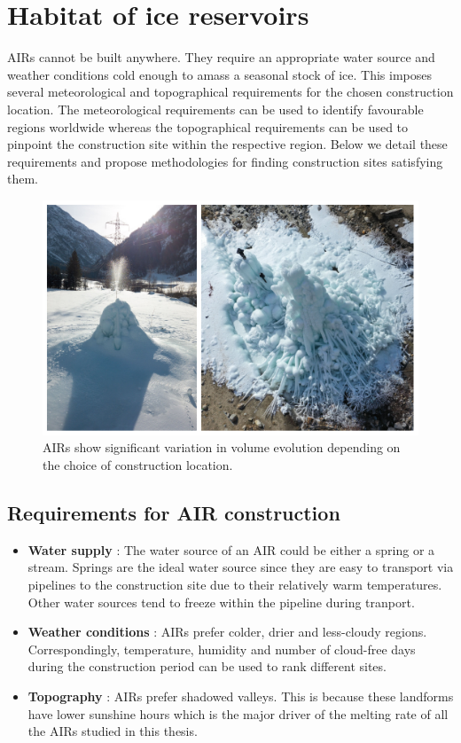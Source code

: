 \chapter{Habitat of ice reservoirs}

AIRs cannot be built anywhere. They require an appropriate water source and weather conditions cold enough to
amass a seasonal stock of ice. This imposes several meteorological and topographical requirements for the chosen
construction location. The meteorological requirements can be used to identify favourable regions worldwide
whereas the topographical requirements can be used to pinpoint the construction site within the respective
region. Below we detail these requirements and propose methodologies for finding construction sites satisfying
them. 

\begin{figure}[t]
\centering
\includegraphics[width=12cm]{Figures/2AIRs.jpg}

\caption{AIRs show significant variation in volume evolution depending on the choice of construction location.}

\label{fig:2AIRs}
\end{figure}

\section{Requirements for AIR construction}

\begin{itemize}
  \item {\bf Water supply} : The water source of an AIR could be either a spring or a stream. Springs are the ideal
    water source since they are easy to transport via pipelines to the construction site due to their relatively
    warm temperatures. Other water sources tend to freeze within the pipeline during tranport. 

  \item {\bf Weather conditions} : AIRs prefer colder, drier and less-cloudy regions. Correspondingly,
    temperature, humidity and number of cloud-free days during the construction period can be used to rank
    different sites. 

  \item {\bf Topography} : AIRs prefer shadowed valleys. This is because these landforms have lower sunshine
    hours which is the major driver of the melting rate of all the AIRs studied in this thesis.

\end{itemize}

